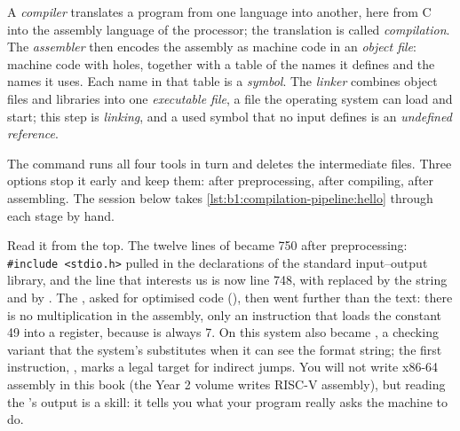 \begin{definition}\label{def:b1:compilation-pipeline:compiler}\label{def:b1:compilation-pipeline:object-file}\label{def:b1:compilation-pipeline:linker}\label{def:b1:compilation-pipeline:executable}
A \emph{compiler} translates a program from one language into another, here from C into the
assembly language of the processor; the translation is called \emph{compilation}. The
\emph{assembler} then encodes the assembly as machine code in an \emph{object file}: machine
code with holes, together with a table of the names it defines and the names it uses. Each name in that table
is a \emph{symbol}. The \emph{linker} combines object files and
libraries into one \emph{executable file}, a file the operating system can load and
start; this step is \emph{linking}, and a used symbol that no input defines is an
\emph{undefined reference}.
\end{definition}

The command  runs all four tools in turn and deletes the intermediate files. Three options stop it
early and keep them:  after preprocessing,  after compiling,  after assembling. The
session below takes \cref{lst:b1:compilation-pipeline:hello} through each stage by hand.

\label{out:b1:compilation-pipeline:stages}

Read it from the top. The twelve lines of  became 750 after preprocessing: \texttt{\#include
<stdio.h>} pulled in the declarations of the standard input--output library, and the line that interests us is
now line 748, with  replaced by the string and  by . The
, asked for optimised code (), then went further than the text: there is no multiplication in
the assembly, only an instruction  that loads the constant 49 into a register, because  is always 7.
On this system  also became , a checking variant that the system's 
substitutes when it can see the format string; the first instruction, , marks a legal target for
indirect jumps. You will not write x86-64 assembly in this book (the Year 2 volume writes RISC-V assembly), but
reading the 's output is a skill: it tells you what your program really asks the machine to do.

